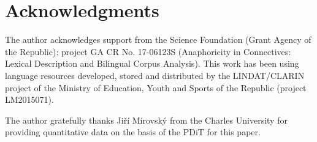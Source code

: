 \documentclass[output=paper]{langsci/langscibook.cls}
\begin{document}
\section*{Acknowledgments}

The author acknowledges support from the  Science Foundation (Grant Agency of the  Republic): project GA CR No. 17-06123S (Anaphoricity in Connectives: Lexical Description and Bilingual Corpus Analysis).
This work has been using language resources developed, stored and distributed by the LINDAT/CLARIN project of the Ministry of Education, Youth and Sports of the  Republic (project LM2015071).

The author gratefully thanks Jiří Mírovský from the Charles University for providing quantitative data on the basis of the PDiT for this paper.

{\sloppy
\printbibliography[heading=subbibliography,notkeyword=this] 
}
\end{document}
